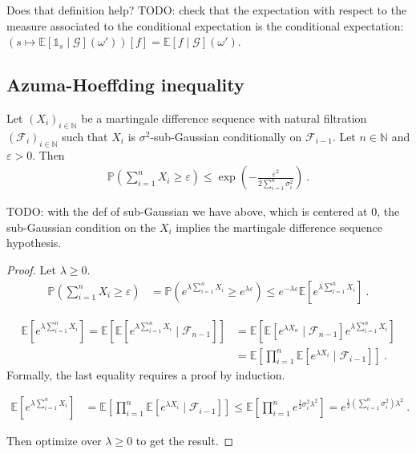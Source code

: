 Does that definition help? TODO: check that the expectation with respect to the measure associated to the conditional expectation is the conditional expectation: $(s \mapsto \mathbb{E}[\mathbb{1}_s \mid \mathcal G](\omega'))[f] = \mathbb{E}[f \mid \mathcal G](\omega')$.

\subsection{Azuma-Hoeffding inequality}
\label{sub:azuma_hoeffding_inequality}

\begin{theorem}
Let $(X_i)_{i\in \mathbb{N}}$ be a martingale difference sequence with natural filtration $(\mathcal F_i)_{i\in \mathbb{N}}$ such that $X_i$ is $\sigma^2$-sub-Gaussian conditionally on $\mathcal F_{i-1}$. Let $n \in \mathbb{N}$ and $\varepsilon > 0$. Then
\begin{align*}
\mathbb{P}(\sum_{i=1}^n X_i \ge \varepsilon) \le \exp \left( - \frac{\varepsilon^2}{2 \sum_{i=1}^n \sigma_i^2} \right) \: .
\end{align*}
\end{theorem}

TODO: with the def of sub-Gaussian we have above, which is centered at 0, the sub-Gaussian condition on the $X_i$ implies the martingale difference sequence hypothesis.

\begin{proof}
Let $\lambda \ge 0$.
\begin{align*}
\mathbb{P}(\sum_{i=1}^n X_i \ge \varepsilon)
&= \mathbb{P}(e^{\lambda\sum_{i=1}^n X_i} \ge e^{\lambda\varepsilon})
\le e^{-\lambda \varepsilon} \mathbb{E}\left[ e^{\lambda\sum_{i=1}^n X_i} \right]
\: .
\end{align*}

\begin{align*}
\mathbb{E}\left[ e^{\lambda\sum_{i=1}^n X_i} \right]
= \mathbb{E}\left[ \mathbb{E}\left[ e^{\lambda\sum_{i=1}^n X_i} \mid \mathcal F_{n-1} \right] \right]
&= \mathbb{E}\left[ \mathbb{E}\left[ e^{\lambda X_n} \mid \mathcal F_{n-1} \right] e^{\lambda\sum_{i=1}^n X_i} \right]
\\
&= \mathbb{E}\left[\prod_{i=1}^n \mathbb{E}\left[ e^{\lambda X_i} \mid \mathcal F_{i-1} \right] \right]
\: .
\end{align*}
Formally, the last equality requires a proof by induction.

\begin{align*}
\mathbb{E}\left[ e^{\lambda\sum_{i=1}^n X_i} \right]
&= \mathbb{E}\left[\prod_{i=1}^n \mathbb{E}\left[ e^{\lambda X_i} \mid \mathcal F_{i-1} \right] \right]
\le \mathbb{E}\left[\prod_{i=1}^n e^{\frac{1}{2} \sigma_i^2 \lambda^2} \right]
= e^{\frac{1}{2} (\sum_{i=1}^n \sigma_i^2) \lambda^2}
\: .
\end{align*}

Then optimize over $\lambda \ge 0$ to get the result.
\end{proof}
